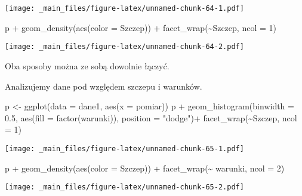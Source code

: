 \documentclass[
]{book}
\newenvironment{Shaded}{\begin{snugshade}}{\end{snugshade}}
\newcommand{\AttributeTok}[1]{\textcolor[rgb]{0.77,0.63,0.00}{#1}}
\newcommand{\DecValTok}[1]{\textcolor[rgb]{0.00,0.00,0.81}{#1}}
\newcommand{\FloatTok}[1]{\textcolor[rgb]{0.00,0.00,0.81}{#1}}
\newcommand{\FunctionTok}[1]{\textcolor[rgb]{0.00,0.00,0.00}{#1}}
\newcommand{\NormalTok}[1]{#1}
\newcommand{\OtherTok}[1]{\textcolor[rgb]{0.56,0.35,0.01}{#1}}
\newcommand{\SpecialCharTok}[1]{\textcolor[rgb]{0.00,0.00,0.00}{#1}}
\newcommand{\StringTok}[1]{\textcolor[rgb]{0.31,0.60,0.02}{#1}}
\begin{document}
\texttt{[image: \_main\_files/figure-latex/unnamed-chunk-64-1.pdf]}

\begin{Shaded}
\begin{Highlighting}[]
\NormalTok{p }\SpecialCharTok{+} \FunctionTok{geom\_density}\NormalTok{(}\FunctionTok{aes}\NormalTok{(}\AttributeTok{color =}\NormalTok{ Szczep)) }\SpecialCharTok{+} \FunctionTok{facet\_wrap}\NormalTok{(}\SpecialCharTok{\textasciitilde{}}\NormalTok{Szczep, }\AttributeTok{ncol =} \DecValTok{1}\NormalTok{)}
\end{Highlighting}
\end{Shaded}

\texttt{[image: \_main\_files/figure-latex/unnamed-chunk-64-2.pdf]}

Oba sposoby można ze sobą dowolnie łączyć.

Analizujemy dane pod względem szczepu i warunków.

\begin{Shaded}
\begin{Highlighting}[]
\NormalTok{p }\OtherTok{\textless{}{-}} \FunctionTok{ggplot}\NormalTok{(}\AttributeTok{data =}\NormalTok{ dane1, }\FunctionTok{aes}\NormalTok{(}\AttributeTok{x =}\NormalTok{ pomiar))}
\NormalTok{p }\SpecialCharTok{+} \FunctionTok{geom\_histogram}\NormalTok{(}\AttributeTok{binwidth =} \FloatTok{0.5}\NormalTok{, }\FunctionTok{aes}\NormalTok{(}\AttributeTok{fill =} \FunctionTok{factor}\NormalTok{(warunki)), }\AttributeTok{position =} \StringTok{"dodge"}\NormalTok{)}\SpecialCharTok{+}
  \FunctionTok{facet\_wrap}\NormalTok{(}\SpecialCharTok{\textasciitilde{}}\NormalTok{Szczep, }\AttributeTok{ncol =} \DecValTok{1}\NormalTok{)}
\end{Highlighting}
\end{Shaded}

\texttt{[image: \_main\_files/figure-latex/unnamed-chunk-65-1.pdf]}

\begin{Shaded}
\begin{Highlighting}[]
\NormalTok{p }\SpecialCharTok{+} \FunctionTok{geom\_density}\NormalTok{(}\FunctionTok{aes}\NormalTok{(}\AttributeTok{color =}\NormalTok{ Szczep)) }\SpecialCharTok{+} \FunctionTok{facet\_wrap}\NormalTok{(}\SpecialCharTok{\textasciitilde{}}\NormalTok{ warunki, }\AttributeTok{ncol =} \DecValTok{2}\NormalTok{)}
\end{Highlighting}
\end{Shaded}

\texttt{[image: \_main\_files/figure-latex/unnamed-chunk-65-2.pdf]}
\end{document}
